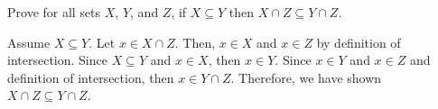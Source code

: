 \documentclass[11pt,addpoints]{exam}
\begin{document}
\begin{questions}
\bonusquestion[3] Prove for all sets $X$, $Y$, and $Z$, if $X \subseteq Y$ then $X \cap Z \subseteq Y \cap Z$.
 \ifprintanswers
        \vspace{-10pt}
    \fi
\begin{solution}
	Assume $X \subseteq Y$.  Let $x \in X \cap Z$.  Then, $x \in X$ and $x \in Z$ by definition of intersection.  Since $X \subseteq Y$ and $x \in X$, then $x \in Y$.  Since $x \in Y$ and $x \in Z$ and definition of intersection, then $x \in Y \cap Z$.  Therefore, we have shown $X \cap Z \subseteq Y \cap Z$.
\end{solution} 


\end{questions}
\end{document}
